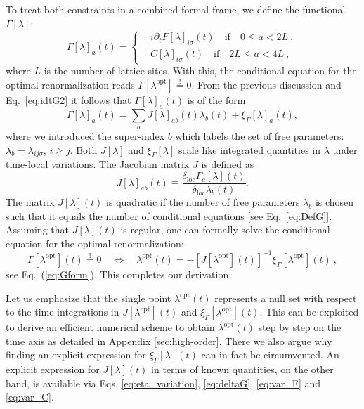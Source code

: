 \documentclass[twocolumn,prb,showpacs,aps,superscriptaddress]{revtex4}
\newcommand{\deltaloc}[0]{\ensuremath{\delta_\mathrm{loc}}}
\begin{document}
To treat both constraints in a combined formal frame, we define 
the functional $\Gamma[\lambda]$:
\begin{equation}
  \label{eq:DefG}
  \Gamma[\lambda]_a(t) = 
  \left\{ 
    \begin{aligned}
      &i \partial_t
       F[\lambda]_{i\sigma}(t) \quad \text{if} \quad 0 \le a < 2L\: , \\
      &C[\lambda]_{i\sigma}(t) \quad \text{if} \quad 2L \le a < 4L \: , 
    \end{aligned}
  \right.
\end{equation}
where $L$ is the number of lattice sites. With this, the conditional
equation for the optimal renormalization reads $\Gamma[\lambda^\text{opt}]
\stackrel{!}{=} 0$. From the previous discussion and Eq.\ \eqref{eq:idtG2} it
follows that $\Gamma[\lambda]_a(t)$ is of the form
\begin{equation}
  \label{eq:Gform}
  \Gamma[\lambda]_a(t) 
  = 
  \sum_{b}  J[\lambda]_{ab}(t) \lambda_b(t)
  +
  \xi_\Gamma[\lambda]_a(t),
\end{equation}
where we introduced the super-index $b$ which labels the set of free
parameters: $\lambda_b = \lambda_{ij\sigma}$, $i \ge j$. Both $J[\lambda]$ and
$\xi_\Gamma[\lambda]$ scale like integrated quantities in $\lambda$ under
time-local variations. The Jacobian matrix $J$ is defined as 
\begin{equation}
  J[\lambda]_{ab}(t) 
  \equiv 
  \frac{\deltaloc \Gamma_a[\lambda](t)}{\deltaloc \lambda_b(t)}.
\end{equation}
The matrix $J[\lambda](t)$ is quadratic if the number of free parameters
$\lambda_b$ is chosen such that it equals the number of conditional equations
[see Eq.\ \eqref{eq:DefG}].  Assuming that $J[\lambda](t)$ is regular, one can
formally solve the conditional equation for the optimal renormalization:
\begin{equation} 
  \label{eq:lopt}
  \Gamma[\lambda^\text{opt}](t) \stackrel{!}{=} 0
  \quad
  \Leftrightarrow
  \quad
  \lambda^\mathrm{opt}(t) 
  = 
  -
  \left[
    J[\lambda^\text{opt}](t)
  \right]^{-1}
  \xi_\Gamma[\lambda^\text{opt}](t) \: , 
\end{equation}
see Eq.\ (\ref{eq:Gform}). This completes our derivation. 

Let us emphasize that the single point $\lambda^\mathrm{opt}(t)$ represents a
null set with respect to the time-integrations in $J[\lambda^\text{opt}](t)$
and $\xi_\Gamma[\lambda^\text{opt}](t)$. This can be exploited to derive an
efficient numerical scheme to obtain $\lambda^\text{opt}(t)$ step by step on
the time axis as detailed in Appendix \ref{sec:high-order}. There we also
argue why finding an explicit expression for $\xi_\Gamma[\lambda](t)$ can in
fact be circumvented.  An explicit expression for $J[\lambda](t)$ in terms of
known quantities, on the other hand, is available via Eqs.
\eqref{eq:eta_variation}, \eqref{eq:deltaG}, \eqref{eq:var_F} and
\eqref{eq:var_C}. 
\end{document}
